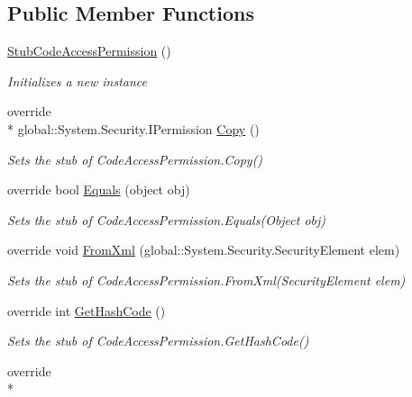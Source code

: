 \subsection*{Public Member Functions}
\begin{DoxyCompactItemize}
\item 
\hyperlink{class_system_1_1_security_1_1_fakes_1_1_stub_code_access_permission_ae299963d1499f2a8ce604fa592bbe6be}{Stub\-Code\-Access\-Permission} ()
\begin{DoxyCompactList}\small\item\em Initializes a new instance\end{DoxyCompactList}\item 
override \\*
global\-::\-System.\-Security.\-I\-Permission \hyperlink{class_system_1_1_security_1_1_fakes_1_1_stub_code_access_permission_a31001005e87caf05981315d24d948134}{Copy} ()
\begin{DoxyCompactList}\small\item\em Sets the stub of Code\-Access\-Permission.\-Copy()\end{DoxyCompactList}\item 
override bool \hyperlink{class_system_1_1_security_1_1_fakes_1_1_stub_code_access_permission_aabd442fd1e0ae343b5ca71bccbae1613}{Equals} (object obj)
\begin{DoxyCompactList}\small\item\em Sets the stub of Code\-Access\-Permission.\-Equals(\-Object obj)\end{DoxyCompactList}\item 
override void \hyperlink{class_system_1_1_security_1_1_fakes_1_1_stub_code_access_permission_a1f4a5f74bbc0c7b9e85b1be7c5376ecd}{From\-Xml} (global\-::\-System.\-Security.\-Security\-Element elem)
\begin{DoxyCompactList}\small\item\em Sets the stub of Code\-Access\-Permission.\-From\-Xml(\-Security\-Element elem)\end{DoxyCompactList}\item 
override int \hyperlink{class_system_1_1_security_1_1_fakes_1_1_stub_code_access_permission_a0bbd23575b128124aad222004229e2a4}{Get\-Hash\-Code} ()
\begin{DoxyCompactList}\small\item\em Sets the stub of Code\-Access\-Permission.\-Get\-Hash\-Code()\end{DoxyCompactList}\item 
override \\*

\end{DoxyCompactItemize}
